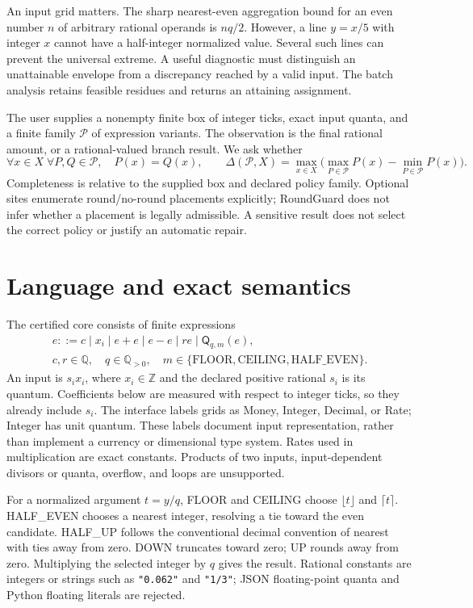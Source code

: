 \documentclass[11pt]{article}
\newcommand{\Q}{\mathsf{Q}}
\newcommand{\Z}{\mathbb Z}
\newcommand{\R}{\mathbb Q}
\begin{document}
An input grid matters. The sharp nearest-even aggregation bound for an even number $n$ of arbitrary rational operands is $nq/2$. However, a line $y=x/5$ with integer $x$ cannot have a half-integer normalized value. Several such lines can prevent the universal extreme. A useful diagnostic must distinguish an unattainable envelope from a discrepancy reached by a valid input. The batch analysis retains feasible residues and returns an attaining assignment.

The user supplies a nonempty finite box of integer ticks, exact input quanta, and a finite family $\mathcal P$ of expression variants. The observation is the final rational amount, or a rational-valued branch result. We ask whether
\[
  \forall x\in X\;\forall P,Q\in\mathcal P,\quad P(x)=Q(x),
 \qquad
  \Delta(\mathcal P,X)=\max_{x\in X}\bigl(\max_{P\in\mathcal P}P(x)-\min_{P\in\mathcal P}P(x)\bigr).
\]
Completeness is relative to the supplied box and declared policy family. Optional sites enumerate round/no-round placements explicitly; RoundGuard does not infer whether a placement is legally admissible. A sensitive result does not select the correct policy or justify an automatic repair.

\section{Language and exact semantics}
The certified core consists of finite expressions
\[
\begin{gathered}
e ::= c\mid x_i\mid e+e\mid e-e\mid r e\mid \Q_{q,m}(e),\\
c,r\in\R,\quad q\in\R_{>0},\quad m\in\{\mathrm{FLOOR},\mathrm{CEILING},\mathrm{HALF\_EVEN}\}.
\end{gathered}
\]
An input is $s_i x_i$, where $x_i\in\Z$ and the declared positive rational $s_i$ is its quantum. Coefficients below are measured with respect to integer ticks, so they already include $s_i$. The interface labels grids as Money, Integer, Decimal, or Rate; Integer has unit quantum. These labels document input representation, rather than implement a currency or dimensional type system. Rates used in multiplication are exact constants. Products of two inputs, input-dependent divisors or quanta, overflow, and loops are unsupported.

For a normalized argument $t=y/q$, FLOOR and CEILING choose $\lfloor t\rfloor$ and $\lceil t\rceil$. HALF\_EVEN chooses a nearest integer, resolving a tie toward the even candidate. HALF\_UP follows the conventional decimal convention of nearest with ties away from zero. DOWN truncates toward zero; UP rounds away from zero. Multiplying the selected integer by $q$ gives the result. Rational constants are integers or strings such as \texttt{"0.062"} and \texttt{"1/3"}; JSON floating-point quanta and Python floating literals are rejected.
\end{document}
